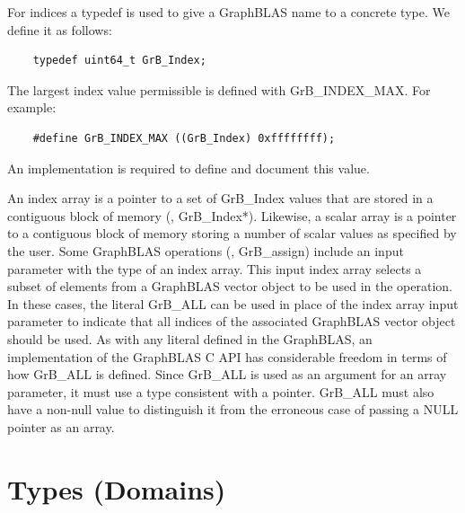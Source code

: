 For indices a {\sf typedef} is used to give a GraphBLAS name to a concrete type. We define it as follows:
\begin{verbatim}
    typedef uint64_t GrB_Index;
\end{verbatim}
The largest index value permissible is defined with {\sf GrB\_INDEX\_MAX}. For example:
\begin{verbatim}
    #define GrB_INDEX_MAX ((GrB_Index) 0xffffffff);
\end{verbatim}
An implementation is required to define and document this value.

An index array is a pointer to a set of {\sf GrB\_Index} values that are 
stored in a contiguous block of memory (\ie, {\sf GrB\_Index*}).
Likewise, a scalar array is a pointer to a contiguous block of memory 
storing a number of scalar values as specified by the user.
Some GraphBLAS operations (\eg, {\sf GrB\_assign})  include an input parameter with the type of an index array. 
This input index array selects a subset of elements from a GraphBLAS vector object to be used in the operation.
In these cases, the literal {\sf GrB\_ALL} 
can be used in place of the index array input parameter to indicate that all indices 
of the associated GraphBLAS vector object should be used.
As with any literal defined in the GraphBLAS, an implementation of the GraphBLAS C API has considerable 
freedom in terms of how {\sf GrB\_ALL} is defined.  Since {\sf GrB\_ALL} is used as an argument for an array 
parameter, it must use a type consistent with a pointer. {\sf GrB\_ALL} must also have a non-null
value to distinguish it from the erroneous case of passing a {\sf NULL} pointer as an array.

\section{Types (Domains)}
\label{Sec:Domains}

